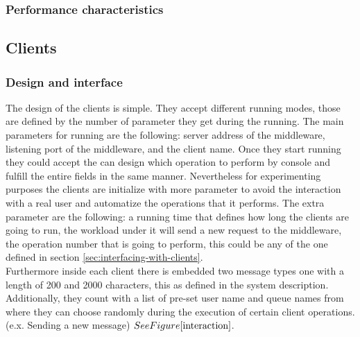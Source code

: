\subsubsection{Performance characteristics}\label{sec:performance-characteristics-1}

\subsection{Clients}\label{sec:clients}


\subsubsection{Design and interface}\label{sec:design-and-interface}
The design of the clients is simple. They accept different running modes, those are defined by the number of parameter they get during the running. The main parameters for running are the following: server address of the middleware, listening port of the middleware, and the client name. Once they start running they could accept the can design which operation to perform by console and fulfill the entire fields in the same manner. Nevertheless for experimenting purposes the clients are initialize with more parameter to avoid the interaction with a real user and automatize the operations that it performs. The extra parameter are the following: a running time that defines how long the clients are going to run, the workload under it will send a new request to the middleware, the operation number that is going to perform, this could be any of the one defined in section \ref{sec:interfacing-with-clients}.\\

Furthermore inside each client there is embedded two message types one with a length of 200 and 2000 characters, this as defined in the system description. Additionally, they count with a list of pre-set user name and queue names from where they can choose randomly during the execution of certain client operations. (e.x. Sending a new message)  \( See Figure \ref{interaction} \).

